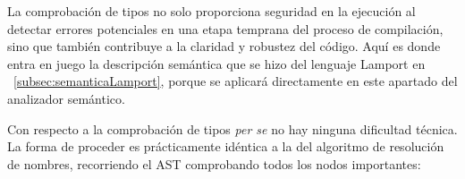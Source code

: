 \vspace{0.5cm}

La comprobación de tipos no solo proporciona seguridad en la ejecución al detectar errores potenciales en una etapa temprana del proceso de compilación, sino que también contribuye a la claridad y robustez del código. Aquí es donde entra en juego la descripción semántica que se hizo del lenguaje Lamport en ~\ref{subsec:semanticaLamport}, porque se aplicará directamente en este apartado del analizador semántico.

\vspace{0.5cm}

Con respecto a la comprobación de tipos \textit{per se} no hay ninguna dificultad técnica. La forma de proceder es prácticamente idéntica a la del algoritmo de resolución de nombres, recorriendo el AST comprobando todos los nodos importantes:

